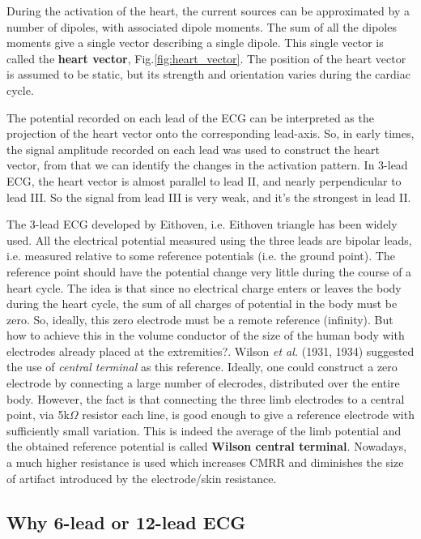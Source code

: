 During the activation of the heart, the current sources can be approximated by a
number of dipoles, with associated dipole moments. The sum of all the dipoles
moments give a single vector describing a single dipole. This single vector is
called the {\bf heart vector}, Fig.\ref{fig:heart_vector}. The position of the
heart vector is assumed to be static, but its strength and orientation varies
during the cardiac cycle.

The potential recorded on each lead of the ECG can be interpreted as the
projection of the heart vector onto the corresponding lead-axis. So, in early
times, the signal amplitude recorded on each lead was used to construct the
heart vector, from that we can identify the changes in the activation pattern.
In 3-lead ECG, the heart vector is almost parallel to lead II, and nearly
perpendicular to lead III. So the signal from lead III is very weak, and it's
the strongest in lead II.

The 3-lead ECG developed by Eithoven, i.e. Eithoven triangle has been widely
used. All the electrical potential measured using the three leads are bipolar
leads, i.e. measured relative to some reference potentials (i.e. the ground
point). The reference point should have the potential change very little during
the course of a heart cycle. The idea is that since no electrical charge enters
or leaves the body during the heart cycle, the sum of all charges of potential
in the body must be zero. So, ideally, this zero electrode must be a remote
reference (infinity). But how to achieve this in the volume conductor of the
size of the human body with electrodes already placed at the extremities?.
Wilson {\it et al.} (1931, 1934) suggested the use of {\it central terminal} as
this reference. Ideally, one could construct a zero electrode by connecting a
large number of elecrodes, distributed over the entire body.
However, the fact is that connecting the three limb electrodes to a central
point, via 5k$\Omega$ resistor each line, is good enough to give a reference
electrode with sufficiently small variation. This is indeed the average of the
limb potential and the obtained reference potential is called {\bf Wilson
central terminal}. Nowadays, a much higher resistance is used which increases
CMRR and diminishes the size of artifact introduced by the electrode/skin
resistance.

\subsection{Why 6-lead or 12-lead ECG}

